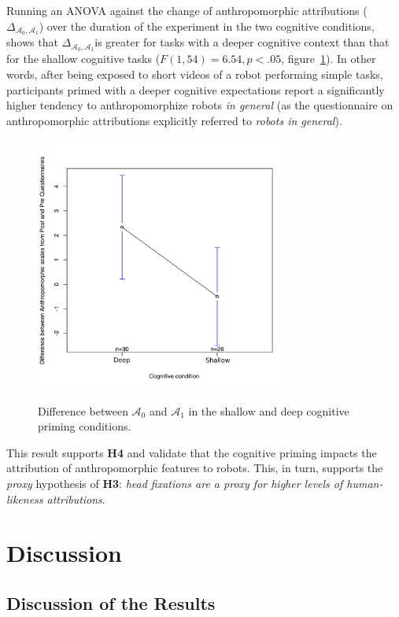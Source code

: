 \documentclass[lettersize, noapacite, twoside, HRI]{apa_HRI}
\newcommand{\h}[1]{\textbf{H#1}\xspace}
\newcommand{\anti}{{$\mathcal{A}_0$\xspace}}
\newcommand{\antf}{{$\mathcal{A}_1$\xspace}}
\newcommand{\deltaant}{{ $\Delta_{\mathcal{A}_0,\mathcal{A}_1}$\xspace}}
\begin{document}
Running an ANOVA against the change of anthropomorphic attributions
(\deltaant) over the duration of the experiment in the two cognitive
conditions, shows that \deltaant is greater for tasks with a deeper cognitive
context than that for the shallow cognitive tasks ($F(1,54) = 6.54, p <
.05$,
figure~\ref{h4}). In other words, after being exposed to short videos of a robot
performing simple tasks, participants primed with a deeper cognitive
expectations report a significantly higher tendency to anthropomorphize robots
\emph{in general} (as the questionnaire on anthropomorphic attributions
explicitly referred to \emph{robots in general}).

\begin{figure}
    \centering
    \includegraphics[width=3.3in]{H4}\label{ICAtoAAPImprovement}
    \caption{Difference between \anti{} and \antf{} in the shallow and deep
    cognitive priming conditions.}
    \label{h4}
\end{figure}

This result supports \h{4} and validate that the cognitive priming impacts the
attribution of anthropomorphic features to robots. This, in turn, supports the
\emph{proxy} hypothesis of \h{3}: \emph{head fixations are a proxy for higher
levels of human-likeness attributions}.


\section{Discussion}

\subsection{Discussion of the Results}
\end{document}
